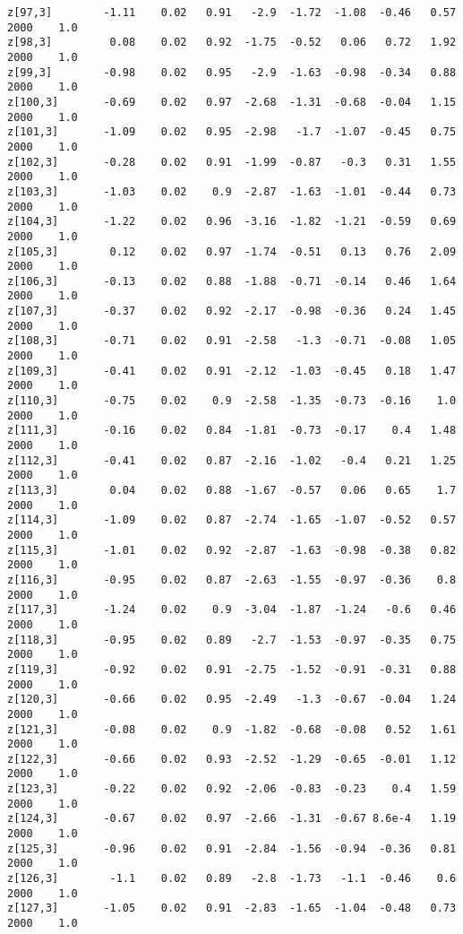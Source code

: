 \documentclass[11pt]{article}
\begin{document}
\begin{Verbatim}[commandchars=\\\{\}]
z[97,3]        -1.11    0.02   0.91   -2.9  -1.72  -1.08  -0.46   0.57   2000    1.0
z[98,3]         0.08    0.02   0.92  -1.75  -0.52   0.06   0.72   1.92   2000    1.0
z[99,3]        -0.98    0.02   0.95   -2.9  -1.63  -0.98  -0.34   0.88   2000    1.0
z[100,3]       -0.69    0.02   0.97  -2.68  -1.31  -0.68  -0.04   1.15   2000    1.0
z[101,3]       -1.09    0.02   0.95  -2.98   -1.7  -1.07  -0.45   0.75   2000    1.0
z[102,3]       -0.28    0.02   0.91  -1.99  -0.87   -0.3   0.31   1.55   2000    1.0
z[103,3]       -1.03    0.02    0.9  -2.87  -1.63  -1.01  -0.44   0.73   2000    1.0
z[104,3]       -1.22    0.02   0.96  -3.16  -1.82  -1.21  -0.59   0.69   2000    1.0
z[105,3]        0.12    0.02   0.97  -1.74  -0.51   0.13   0.76   2.09   2000    1.0
z[106,3]       -0.13    0.02   0.88  -1.88  -0.71  -0.14   0.46   1.64   2000    1.0
z[107,3]       -0.37    0.02   0.92  -2.17  -0.98  -0.36   0.24   1.45   2000    1.0
z[108,3]       -0.71    0.02   0.91  -2.58   -1.3  -0.71  -0.08   1.05   2000    1.0
z[109,3]       -0.41    0.02   0.91  -2.12  -1.03  -0.45   0.18   1.47   2000    1.0
z[110,3]       -0.75    0.02    0.9  -2.58  -1.35  -0.73  -0.16    1.0   2000    1.0
z[111,3]       -0.16    0.02   0.84  -1.81  -0.73  -0.17    0.4   1.48   2000    1.0
z[112,3]       -0.41    0.02   0.87  -2.16  -1.02   -0.4   0.21   1.25   2000    1.0
z[113,3]        0.04    0.02   0.88  -1.67  -0.57   0.06   0.65    1.7   2000    1.0
z[114,3]       -1.09    0.02   0.87  -2.74  -1.65  -1.07  -0.52   0.57   2000    1.0
z[115,3]       -1.01    0.02   0.92  -2.87  -1.63  -0.98  -0.38   0.82   2000    1.0
z[116,3]       -0.95    0.02   0.87  -2.63  -1.55  -0.97  -0.36    0.8   2000    1.0
z[117,3]       -1.24    0.02    0.9  -3.04  -1.87  -1.24   -0.6   0.46   2000    1.0
z[118,3]       -0.95    0.02   0.89   -2.7  -1.53  -0.97  -0.35   0.75   2000    1.0
z[119,3]       -0.92    0.02   0.91  -2.75  -1.52  -0.91  -0.31   0.88   2000    1.0
z[120,3]       -0.66    0.02   0.95  -2.49   -1.3  -0.67  -0.04   1.24   2000    1.0
z[121,3]       -0.08    0.02    0.9  -1.82  -0.68  -0.08   0.52   1.61   2000    1.0
z[122,3]       -0.66    0.02   0.93  -2.52  -1.29  -0.65  -0.01   1.12   2000    1.0
z[123,3]       -0.22    0.02   0.92  -2.06  -0.83  -0.23    0.4   1.59   2000    1.0
z[124,3]       -0.67    0.02   0.97  -2.66  -1.31  -0.67 8.6e-4   1.19   2000    1.0
z[125,3]       -0.96    0.02   0.91  -2.84  -1.56  -0.94  -0.36   0.81   2000    1.0
z[126,3]        -1.1    0.02   0.89   -2.8  -1.73   -1.1  -0.46    0.6   2000    1.0
z[127,3]       -1.05    0.02   0.91  -2.83  -1.65  -1.04  -0.48   0.73   2000    1.0

\end{Verbatim}
\end{document}
